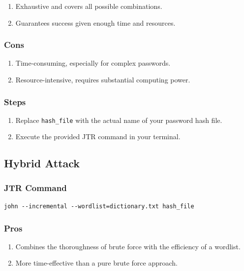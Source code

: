 \documentclass[11pt]{article}
\begin{document}
\begin{enumerate}
    \item Exhaustive and covers all possible combinations.
    \item Guarantees success given enough time and resources.
\end{enumerate}

\subsubsection{Cons}

\begin{enumerate}
    \item Time-consuming, especially for complex passwords.
    \item Resource-intensive, requires substantial computing power.
\end{enumerate}

\subsubsection{Steps}

\begin{enumerate}
    \item Replace \texttt{hash\_file} with the actual name of your password hash file.
    \item Execute the provided JTR command in your terminal.
\end{enumerate}



\subsection{Hybrid Attack}

\subsubsection{JTR Command}

\begin{verbatim}
john --incremental --wordlist=dictionary.txt hash_file
\end{verbatim}

\subsubsection{Pros}

\begin{enumerate}
    \item Combines the thoroughness of brute force with the efficiency of a wordlist.
    \item More time-effective than a pure brute force approach.
\end{enumerate}
\end{document}
